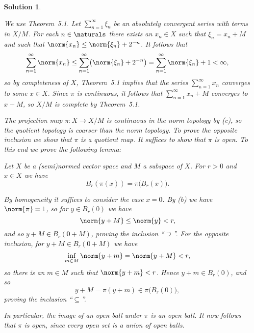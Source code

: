 \documentclass[article, a4paper, 11pt, oneside]{memoir}
\numberwithin{equation}{chapter}
\newenvironment{displaytheorem}{%
	\begin{displayquote}\itshape%
}{%
	\end{displayquote}%
}
\theoremstyle{nonumberplain}
\newtheorem{solution}{Solution}
\begin{document}
\begin{solution}
\begin{solutionsec}
	\item We use Theorem~5.1. Let $\sum_{n=1}^\infty \xi_n$ be an absolutely convergent series with terms in $X/M$. For each $n \in \naturals$ there exists an $x_n \in X$ such that $\xi_n = x_n + M$ and such that $\norm{x_n} \leq \norm{\xi_n} + 2^{-n}$. It follows that
	\begin{equation*}
		\sum_{n=1}^\infty \norm{x_n}
			\leq \sum_{n=1}^\infty \bigl( \norm{\xi_n} + 2^{-n} \bigr)
			= \sum_{n=1}^\infty \norm{\xi_n} + 1
			< \infty,
	\end{equation*}
	so by completeness of $X$, Theorem~5.1 implies that the series $\sum_{n=1}^\infty x_n$ converges to some $x \in X$. Since $\pi$ is continuous, it follows that $\sum_{n=1}^\infty x_n + M$ converges to $x + M$, so $X/M$ is complete by Theorem~5.1.

	\item The projection map $\pi \colon X \to X/M$ is continuous in the norm topology by (c), so the quotient topology is coarser than the norm topology. To prove the opposite inclusion we show that $\pi$ is a quotient map. It suffices to show that $\pi$ is open. To this end we prove the following lemma:
	\begin{displaytheorem}
		Let $X$ be a (semi)normed vector space and $M$ a subspace of $X$. For $r > 0$ and $x \in X$ we have
		\begin{equation*}
			B_r(\pi(x)) = \pi\bigl( B_r(x) \bigr).
		\end{equation*}
	\end{displaytheorem}
	By homogeneity it suffices to consider the case $x = 0$. By (b) we have $\norm{\pi} = 1$, so for $y \in B_r(0)$ we have
	\begin{equation*}
		\norm{y + M}
			\leq \norm{y}
			< r,
	\end{equation*}
	and so $y + M \in B_r(0 + M)$, proving the inclusion \enquote{$\supseteq$}. For the opposite inclusion, for $y + M \in B_r(0 + M)$ we have
	\begin{equation*}
		\inf_{m \in M} \norm{y + m}
			= \norm{y + M}
			< r,
	\end{equation*}
	so there is an $m \in M$ such that $\norm{y+m} < r$. Hence $y+m \in B_r(0)$, and so
	\begin{equation*}
		y + M
			= \pi(y + m)
			\in \pi\bigl( B_r(0) \bigr),
	\end{equation*}
	proving the inclusion \enquote{$\subseteq$}.

	In particular, the image of an open ball under $\pi$ is an open ball. It now follows that $\pi$ is open, since every open set is a union of open balls.
\end{solutionsec}
\end{solution}
\end{document}
